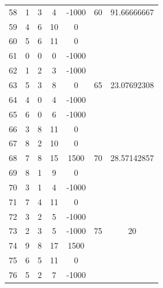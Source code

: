 \documentclass[12pt]{jarticle}
\begin{document}
\begin{table}
\begin{tabular}[h]{|r|c|c|c|c|c|c|}
        58        & 1             & 3             & 4            & -1000 & 60       & 91.66666667 \\
        59        & 4             & 6             & 10           & 0     &          &             \\
        60        & 5             & 6             & 11           & 0     &          &             \\
        \hline 61 & 0             & 0             & 0            & -1000 &          &             \\
        62        & 1             & 2             & 3            & -1000 &          &             \\
        63        & 5             & 3             & 8            & 0     & 65       & 23.07692308 \\
        64        & 4             & 0             & 4            & -1000 &          &             \\
        65        & 6             & 0             & 6            & -1000 &          &             \\
        \hline66  & 3             & 8             & 11           & 0     &          &             \\
        67        & 8             & 2             & 10           & 0     &          &             \\
        68        & 7             & 8             & 15           & 1500  & 70       & 28.57142857 \\
        69        & 8             & 1             & 9            & 0     &          &             \\
        70        & 3             & 1             & 4            & -1000 &          &             \\
        \hline71  & 7             & 4             & 11           & 0     &          &             \\
        72        & 3             & 2             & 5            & -1000 &          &             \\
        73        & 2             & 3             & 5            & -1000 & 75       & 20          \\
        74        & 9             & 8             & 17           & 1500  &          &             \\
        75        & 6             & 5             & 11           & 0     &          &             \\
        \hline76  & 5             & 2             & 7            & -1000 &          &             \\

\end{tabular}
\end{table}
\end{document}
